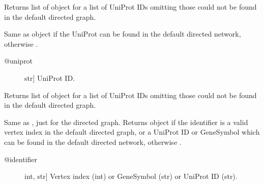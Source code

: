 \documentclass[letterpaper,10pt,english]{sphinxmanual}
\begin{document}
\begin{fulllineitems}
\begin{fulllineitems}
\begin{description}
\end{description}

\end{fulllineitems}


\begin{fulllineitems}
\label{\detokenize{main:pypath.main.PyPath.duniprots}}
Returns list of  object
for a list of UniProt IDs omitting those
could not be found in the default
directed graph.

\end{fulllineitems}


\begin{fulllineitems}
\label{\detokenize{main:pypath.main.PyPath.dup}}
Same as  object if the UniProt
can be found in the default directed network,
otherwise .
\begin{description}
\item[{@uniprot}] \leavevmode{[}str{]}
UniProt ID.

\end{description}

\end{fulllineitems}


\begin{fulllineitems}
\label{\detokenize{main:pypath.main.PyPath.dups}}
Returns list of  object
for a list of UniProt IDs omitting those
could not be found in the default
directed graph.

\end{fulllineitems}


\begin{fulllineitems}
\label{\detokenize{main:pypath.main.PyPath.dv}}
Same as , just for the directed graph.
Returns  object if the identifier
is a valid vertex index in the default directed graph,
or a UniProt ID or GeneSymbol which can be found in the
default directed network, otherwise .
\begin{description}
\item[{@identifier}] \leavevmode{[}int, str{]}
Vertex index (int) or GeneSymbol (str) or UniProt ID (str).


\end{description}
\end{fulllineitems}
\end{fulllineitems}
\end{document}
